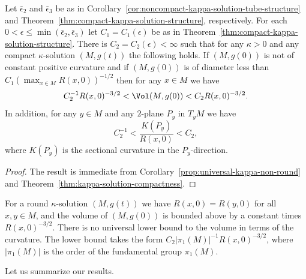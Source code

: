 \begin{proposition}\label{prop:compact-kappa-solution-volume-curvature-bounds}
Let $\bar\epsilon_2$ and $\bar \epsilon_3$ be as in
Corollary~\ref{cor:noncompact-kappa-solution-tube-structure} and Theorem~\ref{thm:compact-kappa-solution-structure}, respectively.
For each $0<\epsilon\le \min(\bar \epsilon_2,\bar\epsilon_3)$
let $C_1=C_1(\epsilon)$ be as in Theorem~\ref{thm:compact-kappa-solution-structure}. There is
$C_2=C_2(\epsilon)<\infty$ such that for any $\kappa>0$ and any
compact $\kappa$-solution $(M,g(t))$ the following holds. If
$(M,g(0))$ is not of constant positive curvature and if $(M,g(0))$
is of diameter less than $C_1(\max_{x\in M}R(x,0))^{-1/2}$ then
for any $x\in M$ we have
$$C_2^{-1}R(x,0)^{-3/2}< \Vol(M,g(0))< C_2R(x,0)^{-3/2}.$$
In addition, for any $y\in M$ and any $2$-plane $P_y$ in $T_yM$  we
have
$$C_2^{-1}< \frac{K(P_y)}{R(x,0)}< C_2,$$
where $K(P_y)$ is the sectional curvature in the $P_y$-direction.
\end{proposition}


\begin{proof}
The result is immediate from Corollary~\ref{prop:universal-kappa-non-round} and
Theorem~\ref{thm:kappa-solution-compactness}.
\end{proof}

\begin{remark}\label{rem:round-kappa-solution-volume-remark}
For a round $\kappa$-solution $(M,g(t))$ we have $R(x,0)=R(y,0)$ for
all $x,y\in M$, and the volume of $(M,g(0))$ is bounded above by a
constant times $R(x,0)^{-3/2}$. There is no universal lower bound to
the volume in terms of the curvature. The lower bound takes the form
$C_2|\pi_1(M)|^{-1}R(x,0)^{-3/2}$, where $|\pi_1(M)|$ is the order
of the fundamental group $\pi_1(M)$.
\end{remark}

Let us summarize our results.

